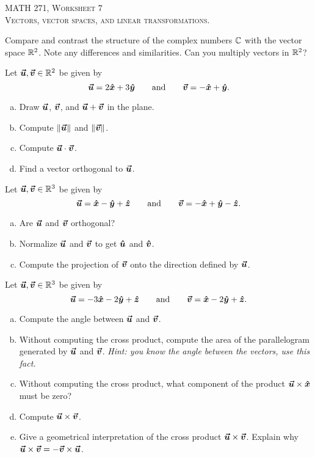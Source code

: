 \documentclass[12pt]{article} %
\begin{document}
\begin{center}
   \textsc{\large MATH 271, Worksheet 7}\\
   \textsc{Vectors, vector spaces, and linear transformations.}
\end{center}
\vspace{.5cm}

\begin{problem}
Compare and contrast the structure of the complex numbers $\C$ with the vector space $\R^2$.  Note any differences and similarities. Can you multiply vectors in $\R^2$?
\end{problem}

\begin{problem}
Let $\vecu,\vecv\in \R^2$ be given by
\[
\vecu = 2\xhat + 3 \yhat \qquad \textrm{and} \qquad \vecv = -\xhat +\yhat.
\]
\begin{enumerate}[(a)]
    \item Draw $\vecu$, $\vecv$, and $\vecu + \vecv$ in the plane.
    \item Compute $\|\vecu\|$ and $\|\vecv\|$.
    \item Compute $\vecu \cdot \vecv$.
    \item Find a vector orthogonal to $\vecu$.
\end{enumerate}
\end{problem}

\begin{problem}
Let $\vecu,\vecv\in \R^3$ be given by
\[
\vecu = \xhat - \yhat + \zhat \qquad \textrm{and} \qquad \vecv = -\xhat + \yhat - \zhat.
\]
\begin{enumerate}[(a)]
    \item Are $\vecu$ and $\vecv$ orthogonal?
    \item Normalize $\vecu$ and $\vecv$ to get $\uhat$ and $\vhat$. 
    \item Compute the projection of $\vecv$ onto the direction defined by $\vecu$.
\end{enumerate}
\end{problem}

\begin{problem}
Let $\vecu,\vecv \in \R^3$ be given by
\[
\vecu = -3\xhat -2\yhat + \zhat \qquad \textrm{and} \qquad \vecv = \xhat -2\yhat +\zhat.
\]
\begin{enumerate}[(a)]
    \item Compute the angle between $\vecu$ and $\vecv$.
    \item Without computing the cross product, compute the area of the parallelogram generated by $\vecu$ and $\vecv$. \emph{Hint: you know the angle between the vectors, use this fact.}
    \item Without computing the cross product, what component of the product $\vecu\times\xhat$ must be zero? 
    \item Compute $\vecu\times \vecv$.
    \item Give a geometrical interpretation of the cross product $\vecu\times \vecv$. Explain why $\vecu\times \vecv = -\vecv \times \vecu$.
\end{enumerate}
\end{problem}
\end{document}
